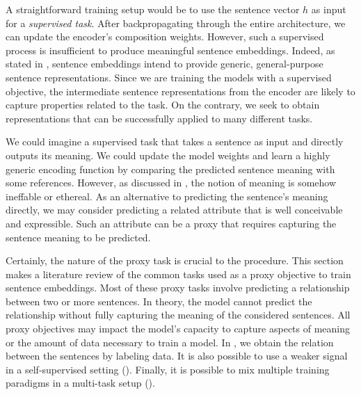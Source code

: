 A straightforward training setup would be to use the sentence vector $h$ as input for a \textit{supervised task}. After backpropagating through the entire architecture, we can update the encoder's composition weights. However, such a supervised process is insufficient to produce meaningful sentence embeddings. Indeed, as stated in , sentence embeddings intend to provide generic, general-purpose sentence representations. Since we are training the models with a supervised objective, the intermediate sentence representations from the encoder are likely to capture properties related to the task. On the contrary, we seek to obtain representations that can be successfully applied to many different tasks.

We could imagine a supervised task that takes a sentence as input and directly outputs its meaning. We could update the model weights and learn a highly generic encoding function by comparing the predicted sentence meaning with some references. However, as discussed in , the notion of meaning is somehow ineffable or ethereal. As an alternative to predicting the sentence's meaning directly, we may consider predicting a related attribute that is well conceivable and expressible. Such an attribute can be a proxy that requires capturing the sentence meaning to be predicted.

Certainly, the nature of the proxy task is crucial to the procedure. This section makes a literature review of the common tasks used as a proxy objective to train sentence embeddings. Most of these proxy tasks involve predicting a relationship between two or more sentences. In theory, the model cannot predict the relationship without fully capturing the meaning of the considered sentences. All proxy objectives may impact the model's capacity to capture aspects of meaning or the amount of data necessary to train a model. In , we obtain the relation between the sentences by labeling data. It is also possible to use a weaker signal in a self-supervised setting (). Finally, it is possible to mix multiple training paradigms in a multi-task setup ().

